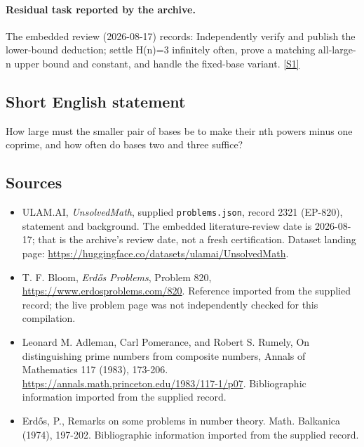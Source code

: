 \documentclass[11pt,a4paper]{article}
\newcommand{\sref}[2]{\hyperlink{source:#1:#2}{[S#2]}}
\begin{document}
\paragraph{Residual task reported by the archive.}

The embedded review (2026-08-17) records: Independently verify and publish the lower-bound deduction; settle H(n)=3 infinitely often, prove a matching all-large-n upper bound and constant, and handle the fixed-base variant. \sref{2321}{1}

\subsection{Short English statement}

How large must the smaller pair of bases be to make their nth powers minus one coprime, and how often do bases two and three suffice?

\subsection{Sources}

{\small

\begin{itemize}

\item[\hypertarget{source:2321:1}{S1}] ULAM.AI, \emph{UnsolvedMath}, supplied \texttt{problems.json}, record 2321 (EP-820), statement and background. The embedded literature-review date is 2026-08-17; that is the archive’s review date, not a fresh certification. Dataset landing page: \url{https://huggingface.co/datasets/ulamai/UnsolvedMath}.

\item[\hypertarget{source:2321:2}{S2}] T. F. Bloom, \emph{Erdős Problems}, Problem 820, \url{https://www.erdosproblems.com/820}. Reference imported from the supplied record; the live problem page was not independently checked for this compilation.

\item[\hypertarget{source:2321:3}{S3}] Leonard M. Adleman, Carl Pomerance, and Robert S. Rumely, On distinguishing prime numbers from composite numbers, Annals of Mathematics 117 (1983), 173-206. \url{https://annals.math.princeton.edu/1983/117-1/p07}. Bibliographic information imported from the supplied record.

\item[\hypertarget{source:2321:4}{S4}] Erd\H{o}s, P., Remarks on some problems in number theory. Math. Balkanica (1974), 197-202. Bibliographic information imported from the supplied record.

\end{itemize}

}

\label{end:2321}
\end{document}
